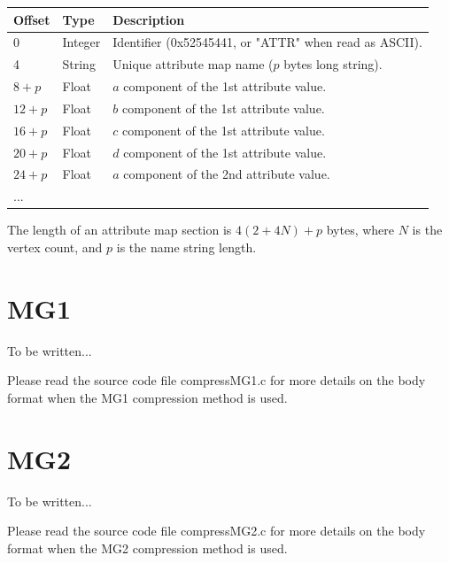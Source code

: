 \begin{tabular}{|l|l|l|}\hline
\textbf{Offset} &  \textbf{Type} & \textbf{Description}\\ \hline
0 & Integer & Identifier (0x52545441, or "ATTR" when read as ASCII).\\ \hline
4 & String & Unique attribute map name ($p$ bytes long string).\\ \hline
$8+p$ & Float & $a$ component of the 1st attribute value.\\ \hline
$12+p$ & Float & $b$ component of the 1st attribute value.\\ \hline
$16+p$ & Float & $c$ component of the 1st attribute value.\\ \hline
$20+p$ & Float & $d$ component of the 1st attribute value.\\ \hline
$24+p$ & Float & $a$ component of the 2nd attribute value.\\ \hline
... & & \\ \hline
\end{tabular}

The length of an attribute map section is $4(2+4N)+p$ bytes, where $N$ is the vertex
count, and $p$ is the name string length.


\section{MG1}
To be written...

Please read the source code file compressMG1.c for more details on the body
format when the MG1 compression method is used.


\section{MG2}
To be written...

Please read the source code file compressMG2.c for more details on the body
format when the MG2 compression method is used.


